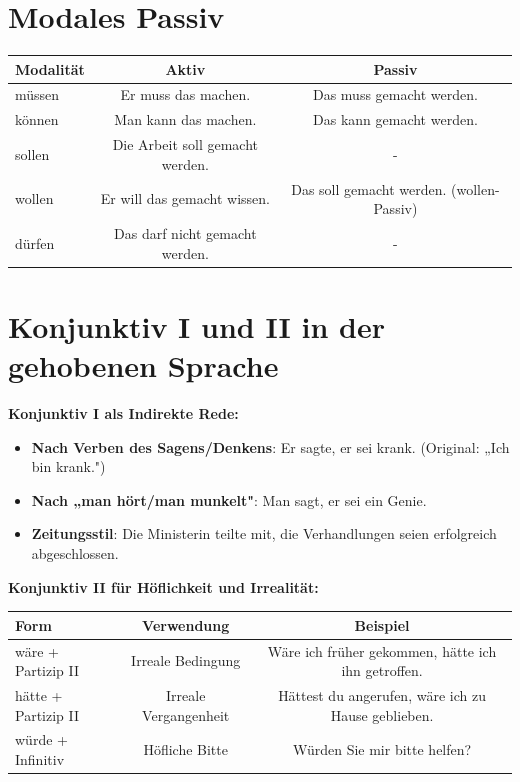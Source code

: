 \section{Modales Passiv}
\label{sec:C2ModalPassiv}

\begin{center}
\begin{tabular}{|l|c|c|}
\hline
Modalität & Aktiv & Passiv \\ \hline
müssen & Er muss das machen. & Das muss gemacht werden. \\ \hline
können & Man kann das machen. & Das kann gemacht werden. \\ \hline
sollen & Die Arbeit soll gemacht werden. & - \\ \hline
wollen & Er will das gemacht wissen. & Das soll gemacht werden. (wollen-Passiv) \\ \hline
dürfen & Das darf nicht gemacht werden. & - \\ \hline
\end{tabular}
\end{center}

\section{Konjunktiv I und II in der gehobenen Sprache}
\label{sec:C2KonjunktivGehoben}

\bigskip
\noindent\textbf{Konjunktiv I als Indirekte Rede:}

\begin{itemize}
    \item \textbf{Nach Verben des Sagens/Denkens}: Er sagte, er sei krank. (Original: „Ich bin krank.")
    \item \textbf{Nach „man hört/man munkelt"}: Man sagt, er sei ein Genie.
    \item \textbf{Zeitungsstil}: Die Ministerin teilte mit, die Verhandlungen seien erfolgreich abgeschlossen.
\end{itemize}

\bigskip
\noindent\textbf{Konjunktiv II für Höflichkeit und Irrealität:}

\begin{center}
\begin{tabular}{|l|c|c|}
\hline
Form & Verwendung & Beispiel \\ \hline
wäre + Partizip II & Irreale Bedingung & Wäre ich früher gekommen, hätte ich ihn getroffen. \\ \hline
hätte + Partizip II & Irreale Vergangenheit & Hättest du angerufen, wäre ich zu Hause geblieben. \\ \hline
würde + Infinitiv & Höfliche Bitte & Würden Sie mir bitte helfen? \\ \hline
\end{tabular}
\end{center}

